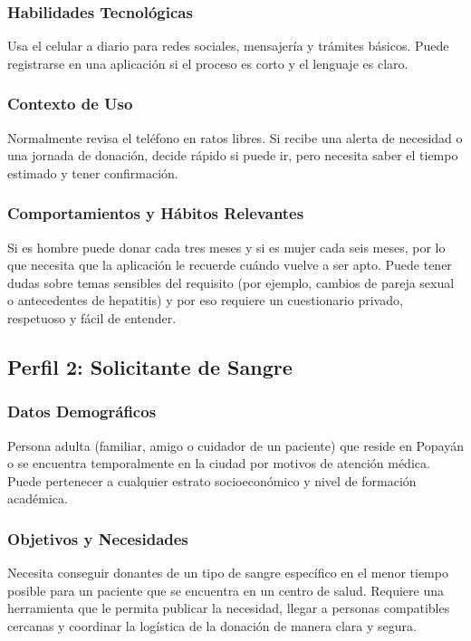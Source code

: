 \subsubsection{Habilidades Tecnológicas}
Usa el celular a diario para redes sociales, mensajería y trámites básicos. Puede registrarse en una aplicación si el proceso es corto y el lenguaje es claro.

\subsubsection{Contexto de Uso}
Normalmente revisa el teléfono en ratos libres. Si recibe una alerta de necesidad o una jornada de donación, decide rápido si puede ir, pero necesita saber el tiempo estimado y tener confirmación.

\subsubsection{Comportamientos y Hábitos Relevantes}
Si es hombre puede donar cada tres meses y si es mujer cada seis meses, por lo que necesita que la aplicación le recuerde cuándo vuelve a ser apto. Puede tener dudas sobre temas sensibles del requisito (por ejemplo, cambios de pareja sexual o antecedentes de hepatitis) y por eso requiere un cuestionario privado, respetuoso y fácil de entender.

\subsection{Perfil 2: Solicitante de Sangre}

\subsubsection{Datos Demográficos}
Persona adulta (familiar, amigo o cuidador de un paciente) que reside en Popayán o se encuentra temporalmente en la ciudad por motivos de atención médica. Puede pertenecer a cualquier estrato socioeconómico y nivel de formación académica.

\subsubsection{Objetivos y Necesidades}
Necesita conseguir donantes de un tipo de sangre específico en el menor tiempo posible para un paciente que se encuentra en un centro de salud. Requiere una herramienta que le permita publicar la necesidad, llegar a personas compatibles cercanas y coordinar la logística de la donación de manera clara y segura.

